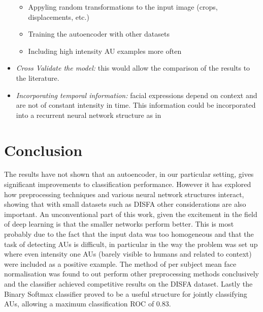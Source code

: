 \begin{itemize}
            \begin{itemize}
              \item Appyling random transformations to the input image (crops, displacements, etc.)
              \item Training the autoencoder with other datasets
              \item Including high intensity AU examples more often
            \end{itemize}
      \item \textit{ Cross Validate the model:} this would allow the comparison of the results
            to the literature.
      \item \textit{ Incorporating temporal information:} facial expressions depend on context
            and are not of constant intensity in time. This information could be incorporated into
            a recurrent neural network structure as in \cite{Jaiswal2016}
    \end{itemize}

\chapter{Conclusion}
  The results have not shown that an autoencoder, in our particular setting,
  gives significant improvements to classification performance. However it has
  explored how preprocessing techniques and various neural network structures
  interact, showing that with small datasets such as DISFA other considerations
  are also important. An unconventional part of this work, given the
  excitement in the field of deep learning is that the smaller networks
  perform better. This is most probably due to the fact that the input data
  was too homogeneous and that the task of detecting AUs is difficult, in
  particular in the way the problem was set up where even intensity one AUs
  (barely visible to humans and related to context) were included as a
  positive example. The method of per subject mean face normalisation was
  found to out perform other preprocessing methods conclusively and the
  classifier achieved competitive results on the DISFA dataset. Lastly the Binary Softmax
  classifier proved to be a useful structure for jointly classifying AUs, allowing a maximum classification ROC of 0.83.
